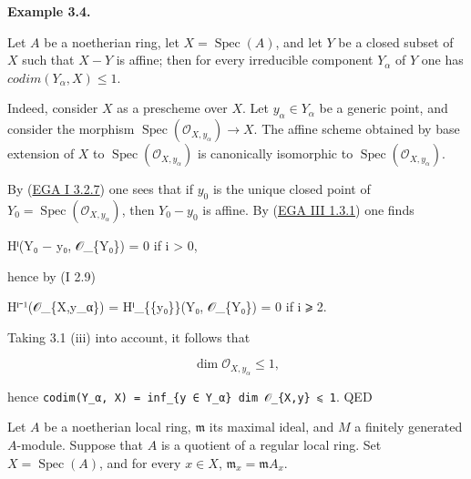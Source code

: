 \documentclass[
  11pt,
  a4paper,
]{book}
\newenvironment{Shaded}{}{}
\newcommand{\NormalTok}[1]{#1}
\begin{document}
\textbf{Example 3.4.}

Let \(A\) be a noetherian ring, let \(X = \operatorname{Spec}(A)\), and
let \(Y\) be a closed subset of \(X\) such that \(X - Y\) is affine;
then for every irreducible component \(Y_{\alpha}\) of \(Y\) one has
\(codim(Y_{\alpha}, X) \leqslant 1\).

Indeed, consider \(X\) as a prescheme over \(X\). Let
\(y_{\alpha} \in Y_{\alpha}\) be a generic point, and consider the
morphism \(\operatorname{Spec}(\mathcal{O}_{X,y_{\alpha}}) \to X\). The
affine scheme obtained by base extension of \(X\) to
\(\operatorname{Spec}(\mathcal{O}_{X,y_{\alpha}})\) is canonically
isomorphic to \(\operatorname{Spec}(\mathcal{O}_{X,y_{\alpha}})\).

By
(\href{https://jcreinhold.github.io/ega/i/01-03-product-of-preschemes.html\#32-products-of-preschemes}{EGA
I 3.2.7}) one sees that if \(y_{0}\) is the unique closed point of
\(Y_{0} =
\operatorname{Spec}(\mathcal{O}_{X,y_{\alpha}})\), then
\(Y_{0} - y_{0}\) is affine. By
(\href{https://jcreinhold.github.io/ega/iii/08-ch3-01-cohomology-affine-schemes.html\#13-cohomology-of-an-affine-scheme}{EGA
III 1.3.1}) one finds

\begin{Shaded}
\begin{Highlighting}[]
\NormalTok{Hⁱ(Y₀ − y₀, 𝒪\_\{Y₀\}) = 0   if i \textgreater{} 0,}
\end{Highlighting}
\end{Shaded}

hence by (I 2.9)

\begin{Shaded}
\begin{Highlighting}[]
\NormalTok{Hⁱ⁻¹(𝒪\_\{X,y\_α\}) = Hⁱ\_\{\{y₀\}\}(Y₀, 𝒪\_\{Y₀\}) = 0   if i ⩾ 2.}
\end{Highlighting}
\end{Shaded}

Taking 3.1 (iii) into account, it follows that

\[ \dim \mathcal{O}_{X,y_{\alpha}} \leqslant 1, \]

hence
\texttt{codim(Y\_α,\ X)\ =\ inf\_\{y\ ∈\ Y\_α\}\ dim\ 𝒪\_\{X,y\}\ ⩽\ 1}.
QED

Let \(A\) be a noetherian local ring, \(\mathfrak{m}\) its maximal
ideal, and \(M\) a finitely generated \(A\)-module. Suppose that \(A\)
is a quotient of a regular local ring. Set
\(X = \operatorname{Spec}(A)\), and for every \(x \in X\),
\(\mathfrak{m}_{x} = \mathfrak{m}A_{x}\).
\end{document}
